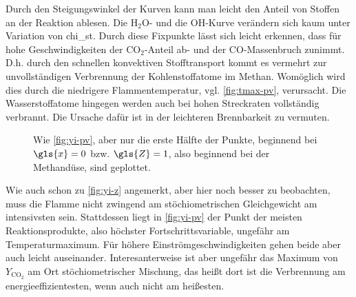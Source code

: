 Durch den Steigungswinkel der Kurven kann man leicht den Anteil von Stoffen an der Reaktion ablesen. Die $\mathrm{H}_2\mathrm{O}$- und die $\mathrm{OH}$-Kurve verändern sich kaum unter Variation von \gls{chi_st}.
Durch diese Fixpunkte lässt sich leicht erkennen, dass für hohe Geschwindigkeiten der $\mathrm{CO}_2$-Anteil ab- und der $\mathrm{CO}$-Massenbruch zunimmt.
D.h. durch den schnellen konvektiven Stofftransport kommt es vermehrt zur unvollständigen Verbrennung der Kohlenstoffatome im Methan. Womöglich wird dies durch die niedrigere Flammentemperatur, vgl. \autoref{fig:tmax-pv}, verursacht.
Die Wasserstoffatome hingegen werden auch bei hohen Streckraten vollständig verbrannt. Die Ursache dafür ist in der leichteren Brennbarkeit zu vermuten.

\begin{figure}[H]
    \begin{center}\begin{minipage}{0.5\linewidth}
        \texttt{[image: \{\{Beleg-oppdiff-Le1/Yi-over-PV-v-0.25-half]}}}
    \end{minipage}\end{center}
    \caption{Wie \autoref{fig:yi-pv}, aber nur die erste Hälfte der Punkte, beginnend bei $\gls{x}=0$ bzw. $\gls{Z}=1$, also beginnend bei der Methandüse, sind geplottet.}
    \label{fig:yi-pv-half}
\end{figure}

Wie auch schon zu \autoref{fig:yi-z} angemerkt, aber hier noch besser zu beobachten, muss die Flamme nicht zwingend am stöchiometrischen Gleichgewicht am intensivsten sein. Stattdessen liegt in \autoref{fig:yi-pv} der Punkt der meisten Reaktionsprodukte, also höchster Fortschrittsvariable, ungefähr am Temperaturmaximum. Für höhere Einströmgeschwindigkeiten gehen beide aber auch leicht auseinander. Interesanterweise ist aber ungefähr das Maximum von $Y_{\mathrm{CO}_2}$ am Ort stöchiometrischer Mischung, das heißt dort ist die Verbrennung am energieeffizientesten, wenn auch nicht am heißesten.
